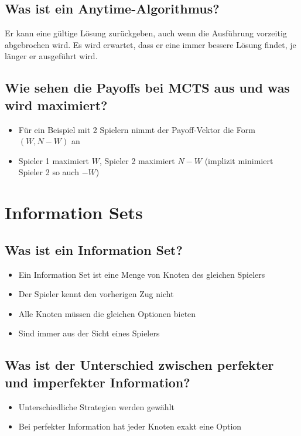 \documentclass[a4paper]{article}
\begin{document}
		\subsection{Was ist ein Anytime-Algorithmus?}
		
		Er kann eine gültige Lösung zurückgeben, auch wenn die Ausführung vorzeitig abgebrochen wird.
		Es wird erwartet, dass er eine immer bessere Lösung findet, je länger er ausgeführt wird.
		
		\subsection{Wie sehen die Payoffs bei MCTS aus und was wird maximiert?}
		
		\begin{itemize}
			\item Für ein Beispiel mit 2 Spielern nimmt der Payoff-Vektor die Form $(W, N-W)$ an
			\item Spieler 1 maximiert $W$, Spieler 2 maximiert $N-W$ (implizit minimiert Spieler 2 so auch $-W$)
		\end{itemize}
	
	\section{Information Sets}
	
		\subsection{Was ist ein Information Set?}
		
		\begin{itemize}
			\item Ein Information Set ist eine Menge von Knoten des gleichen Spielers
			\item Der Spieler kennt den vorherigen Zug nicht
			\item Alle Knoten müssen die gleichen Optionen bieten
			\item Sind immer aus der Sicht eines Spielers
		\end{itemize}
	
		\subsection{Was ist der Unterschied zwischen perfekter und imperfekter Information?}
		
		\begin{itemize}
			\item Unterschiedliche Strategien werden gewählt
			\item Bei perfekter Information hat jeder Knoten exakt eine Option
		\end{itemize}
	
\end{document}
